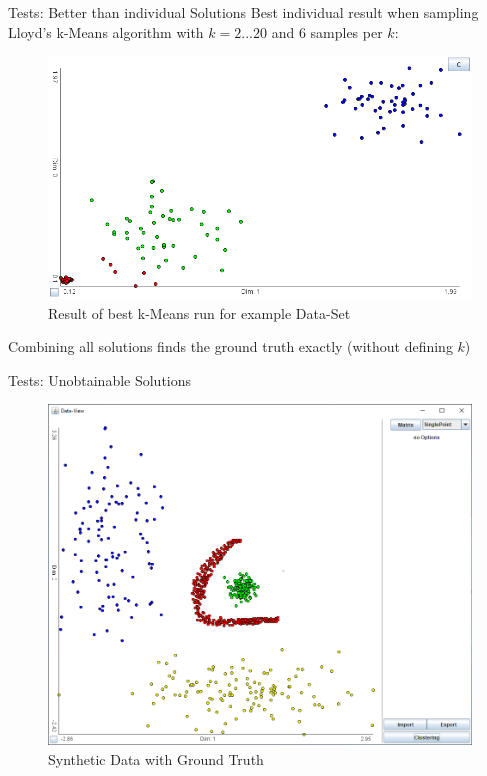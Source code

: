 \documentclass[aspectratio=169]{beamer}
\begin{document}
\begin{frame}{Tests: Better than individual Solutions}
Best individual result when sampling Lloyd's k-Means algorithm with \newline $k=2...20$ and $6$ samples per $k$:
	\begin{figure}[h]
		\centering
		\includegraphics[width=.64\textwidth]{better_base_best}
		\caption{Result of best k-Means run for example Data-Set}
		\label{fig:better_base_best}
	\end{figure}
Combining all solutions finds the ground truth exactly (without defining $k$)
\end{frame}

\begin{frame}{Tests: Unobtainable Solutions}
	\begin{figure}[h]
		\centering
		\includegraphics[width=.64\textwidth]{unob}
		\caption{Synthetic Data with Ground Truth}
		\label{fig:better_base}
	\end{figure}
\end{frame}
\end{document}
